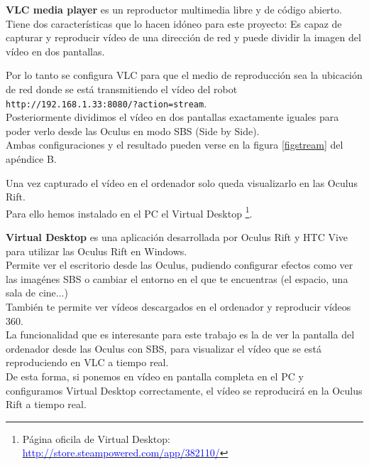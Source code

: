 \documentclass[twoside, 11pt]{epstfg}
\begin{document}
\textbf{VLC media player} es un reproductor multimedia libre y de código abierto. Tiene dos características que lo hacen idóneo para este proyecto: Es capaz de capturar y reproducir vídeo de una dirección de red y puede dividir la imagen del vídeo en dos pantallas.

Por lo tanto se configura VLC para que el medio de reproducción sea la ubicación de red donde se está transmitiendo el vídeo del robot \texttt{http://192.168.1.33:8080/?action=stream}.\\
Posteriormente dividimos el vídeo en dos pantallas exactamente iguales para poder verlo desde las Oculus en modo SBS (Side by Side).\\Ambas configuraciones y el resultado pueden verse en la figura \ref{figstream} del apéndice B.


Una vez capturado el vídeo en el ordenador solo queda visualizarlo en las Oculus Rift.\\
Para ello hemos instalado en el PC el Virtual Desktop \footnote{Página oficila de Virtual Desktop: \href{http://store.steampowered.com/app/382110/}{\textcolor{blue}{http://store.steampowered.com/app/382110/}}}. 

\textbf{Virtual Desktop} es una aplicación desarrollada por Oculus Rift y  HTC Vive para utilizar las Oculus Rift en Windows.\\
Permite ver el escritorio desde las Oculus, pudiendo configurar efectos como ver las imagénes SBS o cambiar el entorno en el que te encuentras (el espacio, una sala de cine...)\\También te permite ver vídeos descargados en el ordenador y reproducir vídeos 360.\\
La funcionalidad que es interesante para este trabajo es la de ver la pantalla del ordenador desde las Oculus con SBS, para visualizar el vídeo que se está reproduciendo en VLC a tiempo real.\\
De esta forma, si ponemos en vídeo en pantalla completa en el PC y configuramos Virtual Desktop correctamente, el vídeo se reproducirá en la Oculus Rift a tiempo real.


\end{document}
